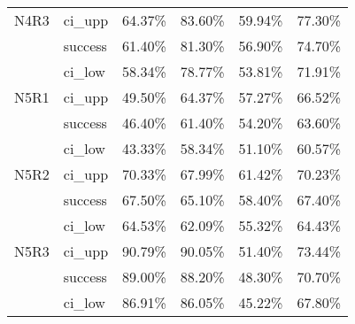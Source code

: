 \begin{tabular}{llrrrr}
N4R3 & ci\_upp &      64.37\% & 83.60\% &       59.94\% & 77.30\% \\
     & success &      61.40\% & 81.30\% &       56.90\% & 74.70\% \\
     & ci\_low &      58.34\% & 78.77\% &       53.81\% & 71.91\% \\
N5R1 & ci\_upp &      49.50\% & 64.37\% &       57.27\% & 66.52\% \\
     & success &      46.40\% & 61.40\% &       54.20\% & 63.60\% \\
     & ci\_low &      43.33\% & 58.34\% &       51.10\% & 60.57\% \\
N5R2 & ci\_upp &      70.33\% & 67.99\% &       61.42\% & 70.23\% \\
     & success &      67.50\% & 65.10\% &       58.40\% & 67.40\% \\
     & ci\_low &      64.53\% & 62.09\% &       55.32\% & 64.43\% \\
N5R3 & ci\_upp &      90.79\% & 90.05\% &       51.40\% & 73.44\% \\
     & success &      89.00\% & 88.20\% &       48.30\% & 70.70\% \\
     & ci\_low &      86.91\% & 86.05\% &       45.22\% & 67.80\% \\
\bottomrule
\end{tabular}

